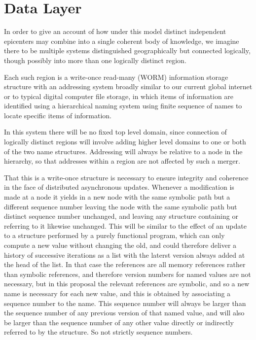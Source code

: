 \documentclass[10pt,titlepage]{book}
\begin{document}
\section{Data Layer}

In order to give an account of how under this model distinct independent epicenters may combine into a single coherent body of knowledge, we imagine there to be multiple systems distinguished geographically but connected logically, though possibly into more than one logically distinct region.

Each such region is a write-once read-many (WORM) information storage structure with an addressing system broadly similar to our current global internet or to typical digital computer file storage, in which items of information are identified using a hierarchical naming system using finite sequence of names to locate specific items of information.

In this system there will be no fixed top level domain, since connection of logically distinct regions will involve adding higher level domains to one or both of the two name structures.
Addressing will always be relative to a node in the hierarchy, so that addresses within a region are not affected by such a merger.

That this is a write-once structure is necessary to ensure integrity and coherence in the face of distributed asynchronous updates.
Whenever a modification is made at a node it yields in a new node with the same symbolic path but a different sequence number leaving the node with the same symbolic path but distinct sequence number unchanged, and leaving any structure containing or referring to it likewise unchanged.
This will be similar to the effect of an update to a structure performed by a purely functional program, which can only compute a new value without changing the old, and could therefore deliver a history of successive iterations as a list with the laterst version always added at the head of the list.
In that case the references are all memory references rather than symbolic references, and therefore version numbers for named values are not necessary, but in this proposal the relevant references are symbolic, and so a new name is necessary for each new value, and this is obtained by associating a sequence number to the name.
This sequence number will always be larger than the sequence number of any previous version of that named value, and will also be larger than the sequence number of any other value directly or indirectly referred to by the structure.
So not strictly sequence numbers.
\end{document}
